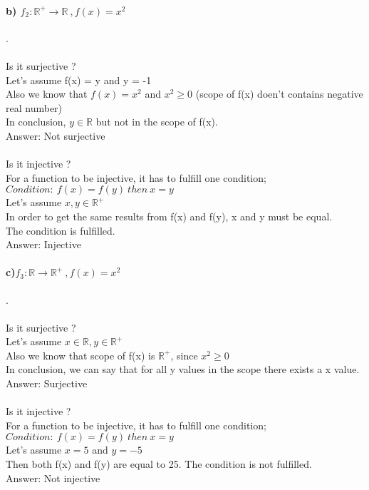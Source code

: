 \documentclass[12pt]{article}
\begin{document}
\paragraph{b) $f_2: \mathbb{R^{+}} \rightarrow \mathbb{R} \ , f(x) = x^2$}
 .\\
\\
Is it surjective ? \\
Let's assume f(x) = y and y = -1\\
Also we know that $f(x) = x^2$ and $x^2 \geq 0$ (scope of f(x) doen't contains negative real number)\\
In conclusion, $y \in \mathbb{R}$ but not in the scope of f(x).\\
Answer: Not surjective\\ 
\\
Is it injective ? \\
For a function to be injective, it has to fulfill one condition;\\
$Condition: \ f(x) = f(y)\ then\ x = y $ \\
Let's assume $x,y \in \mathbb{R^{+}}$\\
In order to get the same results from f(x) and f(y), x and y must be equal.\\
The condition is fulfilled.\\
Answer: Injective\\


\paragraph{c)$f_3: \mathbb{R} \rightarrow \mathbb{R^{+}} \ , f(x) = x^2$}
 .\\
\\
Is it surjective ? \\
Let's assume $x \in \mathbb{R}, y \in \mathbb{R^{+}}$\\
Also we know that scope of f(x) is $\mathbb{R^{+}}$, since $x^2 \geq 0$ \\
In conclusion, we can say that for all y values in the scope there exists a x value.\\
Answer: Surjective\\ 
\\
Is it injective ? \\
For a function to be injective, it has to fulfill one condition;\\
$Condition: \ f(x) = f(y)\ then\ x = y $ \\
Let's assume $x = 5$ and $y = -5$\\
Then both f(x) and f(y) are equal to 25. The condition is not fulfilled.\\
Answer: Not injective\\
\end{document}
